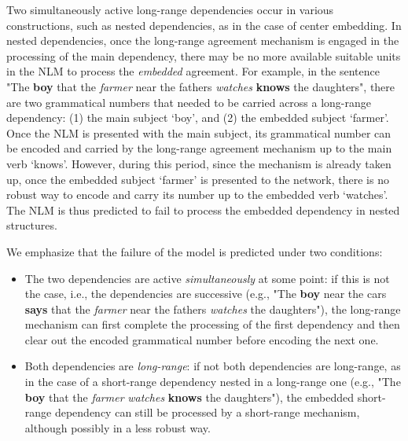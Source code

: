 Two simultaneously active long-range dependencies occur in various constructions, such as nested dependencies, as in the case of center embedding. In nested dependencies, once the long-range agreement mechanism is engaged in the processing of the main dependency, there may be no more available suitable units in the NLM to process the \textit{embedded} agreement. For example, in the sentence "The \textbf{boy} that the \textit{farmer} near the fathers \textit{watches} \textbf{knows} the daughters", there are two grammatical numbers that needed to be carried across a long-range dependency: (1) the main subject `boy', and (2) the embedded subject `farmer'. Once the NLM is presented with the main subject, its grammatical number can be encoded and carried by the long-range agreement mechanism up to the main verb `knows'. However, during this period, since the mechanism is already taken up, once the embedded subject `farmer' is presented to the network, there is no robust way to encode and carry its number up to the embedded verb `watches'. The NLM is thus predicted to fail to process the embedded dependency in nested structures.

We emphasize that the failure of the model is predicted under two conditions:
\begin{itemize}
	\item The two dependencies are active \textit{simultaneously} at some point: if this is not the case, i.e., the dependencies are successive (e.g., "The \textbf{boy} near the cars \textbf{says} that the \textit{farmer} near the fathers \textit{watches} the daughters"), the long-range mechanism can first complete the processing of the first dependency and then clear out the encoded grammatical number before encoding the next one. 

    \item Both dependencies are \textit{long-range}: if not both dependencies are long-range, as in the case of a short-range dependency nested in a long-range one (e.g., "The \textbf{boy} that the \textit{farmer} \textit{watches} \textbf{knows} the daughters"), the embedded short-range dependency can still be processed by a short-range mechanism, although possibly in a less robust way. 
\end{itemize}

